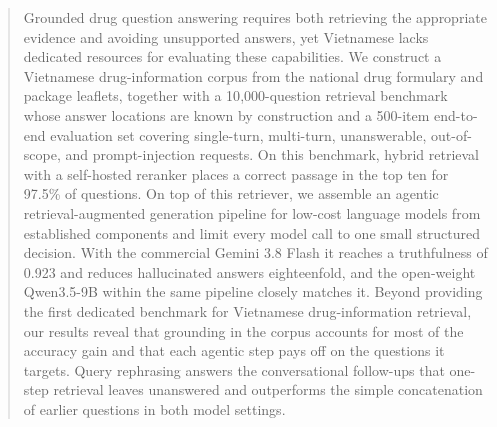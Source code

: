 \begin{abstract}
Grounded drug question answering requires both retrieving the appropriate evidence and avoiding unsupported answers, yet Vietnamese lacks dedicated resources for evaluating these capabilities. We construct a Vietnamese drug-information corpus from the national drug formulary and package leaflets, together with a 10{,}000-question retrieval benchmark whose answer locations are known by construction and a 500-item end-to-end evaluation set covering single-turn, multi-turn, unanswerable, out-of-scope, and prompt-injection requests. On this benchmark, hybrid retrieval with a self-hosted reranker places a correct passage in the top ten for 97.5\% of questions. On top of this retriever, we assemble an agentic retrieval-augmented generation pipeline for low-cost language models from established components and limit every model call to one small structured decision. With the commercial Gemini 3.8 Flash it reaches a truthfulness of 0.923 and reduces hallucinated answers eighteenfold, and the open-weight Qwen3.5-9B within the same pipeline closely matches it. Beyond providing the first dedicated benchmark for Vietnamese drug-information retrieval, our results reveal that grounding in the corpus accounts for most of the accuracy gain and that each agentic step pays off on the questions it targets. Query rephrasing answers the conversational follow-ups that one-step retrieval leaves unanswered and outperforms the simple concatenation of earlier questions in both model settings.
\end{abstract}
